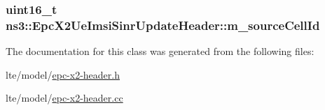 \subsubsection[{\texorpdfstring{m\+\_\+source\+Cell\+Id}{m_sourceCellId}}]{\setlength{\rightskip}{0pt plus 5cm}uint16\+\_\+t ns3\+::\+Epc\+X2\+Ue\+Imsi\+Sinr\+Update\+Header\+::m\+\_\+source\+Cell\+Id\hspace{0.3cm}{\ttfamily [private]}}\hypertarget{classns3_1_1EpcX2UeImsiSinrUpdateHeader_a501240ac9c8dd81e9f1dff3719c98a2e}{}\label{classns3_1_1EpcX2UeImsiSinrUpdateHeader_a501240ac9c8dd81e9f1dff3719c98a2e}


The documentation for this class was generated from the following files\+:\begin{DoxyCompactItemize}
\item 
lte/model/\hyperlink{epc-x2-header_8h}{epc-\/x2-\/header.\+h}\item 
lte/model/\hyperlink{epc-x2-header_8cc}{epc-\/x2-\/header.\+cc}\end{DoxyCompactItemize}
